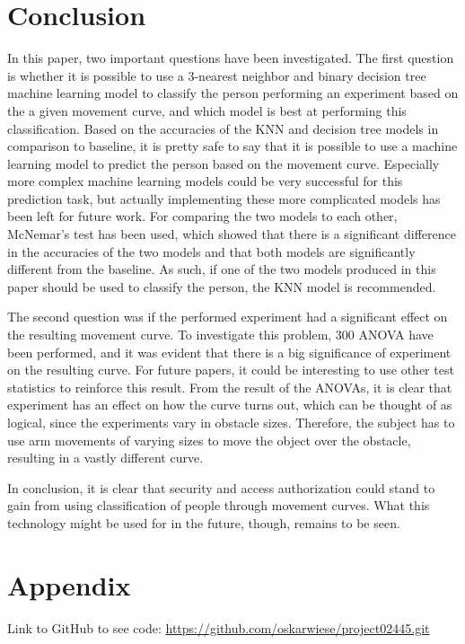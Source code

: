 \documentclass[11pt, fleqn, titlepage]{article}
\begin{document}
\section{Conclusion} \vspace*{-0.1cm}
In this paper, two important questions have been investigated. The first question is whether it is possible to use a 3-nearest neighbor and binary decision tree machine learning model to classify the person performing an experiment based on the a given movement curve, and which model is best at performing this classification. Based on the accuracies of the KNN and decision tree models in comparison to baseline, it is pretty safe to say that it is possible to use a machine learning model to predict the person based on the movement curve. Especially more complex machine learning models could be very successful for this prediction task, but actually implementing these more complicated models has been left for future work. For comparing the two models to each other, McNemar's test has been used, which showed that there is a significant difference in the accuracies of the two models and that both models are significantly different from the baseline. As such, if one of the two models produced in this paper should be used to classify the person, the KNN model is recommended.

The second question was if the performed experiment had a significant effect on the resulting movement curve. To investigate this problem, 300 ANOVA have been performed, and it was evident that there is a big significance of experiment on the resulting curve. For future papers, it could be interesting to use other test statistics to reinforce this result. From the result of the ANOVAs, it is clear that experiment has an effect on how the curve turns out, which can be thought of as logical, since the experiments vary in obstacle sizes. Therefore, the subject has to use arm movements of varying sizes to move the object over the obstacle, resulting in a vastly different curve.

In conclusion, it is clear that security and access authorization could stand to gain from using classification of people through movement curves. What this technology might be used for in the future, though, remains to be seen.
\newpage
\section{Appendix}
Link to GitHub to see code:
\url{https://github.com/oskarwiese/project02445.git}
	


\end{document}
